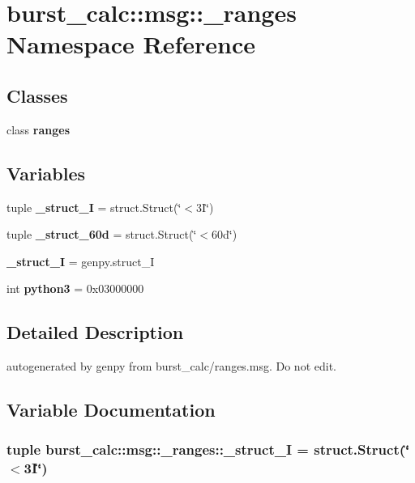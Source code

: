 \section{burst\-\_\-calc\-:\-:msg\-:\-:\-\_\-ranges \-Namespace \-Reference}
\label{namespaceburst__calc_1_1msg_1_1__ranges}
\subsection*{\-Classes}
\begin{DoxyCompactItemize}
\item 
class {\bf ranges}
\end{DoxyCompactItemize}
\subsection*{\-Variables}
\begin{DoxyCompactItemize}
\item 
tuple {\bf \-\_\-struct\-\_\-I} = struct.\-Struct(\char`\"{}$<$3\-I\char`\"{})
\item 
tuple {\bf \-\_\-struct\-\_\-60d} = struct.\-Struct(\char`\"{}$<$60d\char`\"{})
\item 
{\bf \-\_\-struct\-\_\-\-I} = genpy.\-struct\-\_\-\-I
\item 
int {\bf python3} = 0x03000000
\end{DoxyCompactItemize}


\subsection{\-Detailed \-Description}
\begin{DoxyVerb}autogenerated by genpy from burst_calc/ranges.msg. Do not edit.\end{DoxyVerb}
 

\subsection{\-Variable \-Documentation}
\subsubsection[{\-\_\-struct\-\_\-3\-I}]{\setlength{\rightskip}{0pt plus 5cm}tuple {\bf burst\-\_\-calc\-::msg\-::\-\_\-ranges\-::\-\_\-struct\-\_\-I} = struct.\-Struct(\char`\"{}$<$3\-I\char`\"{})}\label{namespaceburst__calc_1_1msg_1_1__ranges_a3d82f4c5873bd5ecbeb7163797152db5}


